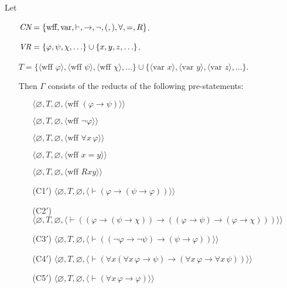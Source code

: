 Let
\begin{itemize}
  \item[] $\mbox{\em CN}=\{\mbox{wff}, \mbox{var}, \vdash, \to, \lnot, (,),\forall,=,R\}$.
  \item[] $\mbox{\em VR}=\{\varphi,\psi,\chi,\ldots\}\cup\{x,y,z,\ldots\}$.
  \item[] $T = \{\langle \mbox{wff\ } \varphi\rangle,
             \langle \mbox{wff\ } \psi\rangle,
             \langle \mbox{wff\ } \chi\rangle,\ldots\}\cup
       \{\langle \mbox{var\ } x\rangle, \langle \mbox{var\ } y\rangle, \langle
       \mbox{var\ }z\rangle,\ldots\}$.

\noindent Then
  $\Gamma$ consists of the reducts of the following pre-statements:
    \begin{itemize}
      \item[] $\langle\varnothing,T,\varnothing,
               \langle \mbox{wff\ }(\varphi\to\psi)\rangle\rangle$
      \item[] $\langle\varnothing,T,\varnothing,
               \langle \mbox{wff\ }\lnot\varphi\rangle\rangle$
      \item[] $\langle\varnothing,T,\varnothing,
               \langle \mbox{wff\ }\forall x\,\varphi\rangle\rangle$
      \item[] $\langle\varnothing,T,\varnothing,
               \langle \mbox{wff\ }x=y\rangle\rangle$
      \item[] $\langle\varnothing,T,\varnothing,
               \langle \mbox{wff\ }Rxy\rangle\rangle$
      \item[(C1$'$)] $\langle\varnothing,T,\varnothing,
               \langle \vdash(\varphi\to(\psi\to\varphi))
               \rangle\rangle$
      \item[(C2$'$)] $\langle\varnothing,T,
               \varnothing,
               \langle \vdash((\varphi\to(\psi\to\chi))\to
               ((\varphi\to\psi)\to(\varphi\to\chi)))
               \rangle\rangle$
      \item[(C3$'$)] $\langle\varnothing,T,
               \varnothing,
               \langle \vdash((\lnot\varphi\to\lnot\psi)\to
               (\psi\to\varphi))\rangle\rangle$
      \item[(C4$'$)] $\langle\varnothing,T,
               \varnothing,
               \langle \vdash(\forall x(\forall x\,\varphi\to\psi)\to
                 (\forall x\,\varphi\to\forall x\,\psi))\rangle\rangle$
      \item[(C5$'$)] $\langle\varnothing,T,
               \varnothing,
               \langle \vdash(\forall x\,\varphi\to\varphi)\rangle\rangle$

\end{itemize}
\end{itemize}
